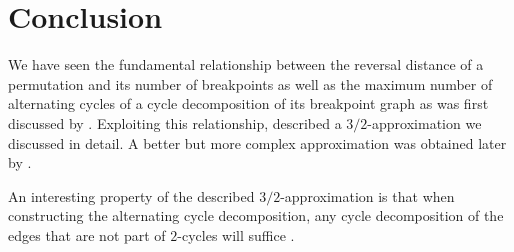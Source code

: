 \documentclass[11pt,DIV=11]{scrartcl}
\theoremstyle{definition}
\theoremstyle{remark}
\begin{document}
\section{Conclusion}
\label{sec:conclusion}

We have seen the fundamental relationship between the reversal distance of a permutation and its number of breakpoints as well as the maximum number of alternating cycles of a cycle decomposition of its breakpoint graph as was first discussed by \citeauthor*{Bafna1996}. Exploiting this relationship, \citeauthor*{Christie1998} described a $3/2$-approximation we discussed in detail. A better but more complex approximation was obtained later by \citeauthor*{Berman2001}.

An interesting property of the described $3/2$-approximation is that when constructing the alternating cycle decomposition, any cycle decomposition of the edges that are not part of $2$-cycles will suffice \cite{Christie1998}.

\printbibliography
\end{document}
